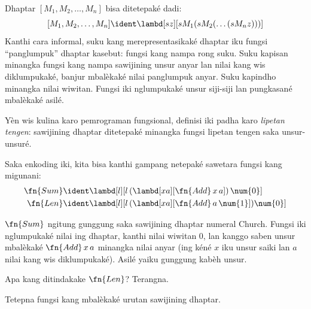 \documentclass[../../../include/open-logic-section]{subfiles}
\begin{document}

Dhaptar $[M_1, M_2, \ldots, M_n]$ bisa ditetepaké dadi:
\[
  [M_1, M_2, \ldots, M_n] \ident \lambd[sz][s M_1 (s M_2 (\ldots (s M_n z)))]
\]
Kanthi cara informal, suku kang merepresentasikaké dhaptar
iku fungsi ``panglumpuk'' dhaptar kasebut: fungsi kang nampa
rong suku. Suku kapisan minangka fungsi kang nampa sawijining unsur anyar lan nilai kang
wis diklumpukaké, banjur mbalèkaké
nilai panglumpuk anyar. Suku kapindho minangka nilai wiwitan.
Fungsi iki nglumpukaké unsur siji-siji lan pungkasané
mbalèkaké asilé.

\begin{digress}
  Yèn wis kulina karo pemrograman fungsional, definisi iki
  padha karo \emph{lipetan tengen}: sawijining dhaptar
  ditetepaké minangka fungsi lipetan tengen saka unsur-unsuré.
\end{digress}

Saka enkoding iki, kita bisa kanthi gampang netepaké
sawetara fungsi kang migunani:
\begin{align*}
  \fn{Sum} & \ident
  \lambd[l][l \, (\lambd[xa][\fn{Add} \, x \, a])\,  \num{0}]\\
  \fn{Len} & \ident
  \lambd[l][l \, (\lambd[xa][\fn{Add} \, a \, \num{1}]) \num{0}]
\end{align*}

$\fn{Sum}$ ngitung gunggung saka sawijining dhaptar numeral
Church. Fungsi iki nglumpukaké nilai ing dhaptar, kanthi nilai
wiwitan $\num{0}$, lan kanggo saben unsur mbalèkaké
$\fn{Add} \, x\, a$ minangka nilai anyar (ing kéné $x$
iku unsur saiki lan $a$ nilai kang wis diklumpukaké).
Asilé yaiku gunggung kabèh unsur.

\begin{prob}
  Apa kang ditindakake $\fn{Len}$? Terangna.
\end{prob}

\begin{prob}
  Tetepna fungsi kang mbalèkaké urutan sawijining dhaptar.
\end{prob}
\end{document}
